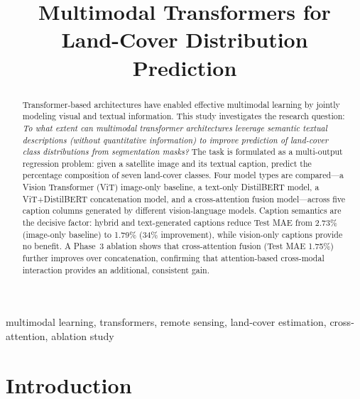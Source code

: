 \documentclass[conference]{IEEEtran}
\begin{document}
\title{Multimodal Transformers for Land-Cover Distribution Prediction}

\author{
}

\maketitle

\begin{abstract}
Transformer-based architectures have enabled effective multimodal learning by jointly
modeling visual and textual information. This study investigates the research question:
\textit{To what extent can multimodal transformer architectures leverage semantic textual
descriptions (without quantitative information) to improve prediction of land-cover class
distributions from segmentation masks?} The task is formulated as a multi-output
regression problem: given a satellite image and its textual caption, predict the
percentage composition of seven land-cover classes. Four model types are compared---a
Vision Transformer (ViT) image-only baseline, a text-only DistilBERT model, a
ViT+DistilBERT concatenation model, and a cross-attention fusion model---across five
caption columns generated by different vision-language models. Caption semantics are the
decisive factor: hybrid and text-generated captions reduce Test MAE from 2.73\%
(image-only baseline) to 1.79\% (34\% improvement), while vision-only captions provide
no benefit. A Phase~3 ablation shows that cross-attention fusion (Test MAE 1.75\%)
further improves over concatenation, confirming that attention-based cross-modal
interaction provides an additional, consistent gain.
\end{abstract}

\begin{IEEEkeywords}
multimodal learning, transformers, remote sensing, land-cover estimation, cross-attention, ablation study
\end{IEEEkeywords}

\section{Introduction}
\end{document}
